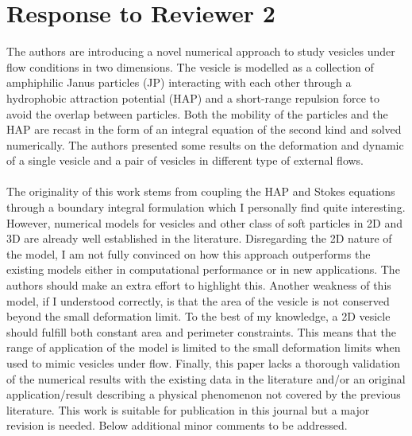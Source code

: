 \documentclass[11pt]{article}
\newcommand{\comment}[1]{{\color{blue} #1}}
\begin{document}
\section*{Response to Reviewer 2}
\comment{
\noindent
The authors are introducing a novel numerical approach to study vesicles
under flow conditions in two dimensions. The vesicle is modelled as a
collection of amphiphilic Janus particles (JP) interacting with each
other through a hydrophobic attraction potential (HAP) and a short-range
repulsion force to avoid the overlap between particles. Both the
mobility of the particles and the HAP are recast in the form of an
integral equation of the second kind and solved numerically. The authors
presented some results on the deformation and dynamic of a single
vesicle and a pair of vesicles in different type of external flows.
\\ \\
\noindent
The originality of this work stems from coupling the HAP and Stokes
equations through a boundary integral formulation which I personally
find quite interesting. However, numerical models for vesicles and other
class of soft particles in 2D and 3D are already well established in the
literature. Disregarding the 2D nature of the model, I am not fully
convinced on how this approach outperforms the existing models either in
computational performance or in new applications. The authors should
make an extra effort to highlight this. Another weakness of this model,
if I understood correctly, is that the area of the vesicle is not
conserved beyond the small deformation limit. To the best of my
knowledge, a 2D vesicle should fulfill both constant area and perimeter
constraints. This means that the range of application of the model is
limited to the small deformation limits when used to mimic vesicles
under flow. Finally, this paper lacks a thorough validation of the
numerical results with the existing data in the literature and/or an
original application/result describing a physical phenomenon not covered
by the previous literature. This work is suitable for publication in
this journal but a major revision is needed. Below additional minor
comments to be addressed.}
\end{document}
